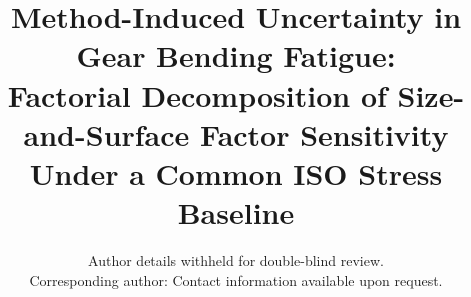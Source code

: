 \documentclass[twocolumn,12pt,a4paper]{article}
\begin{document}
\sloppy  %

\title{\textbf{Method-Induced Uncertainty in Gear Bending Fatigue:\\
Factorial Decomposition of Size-and-Surface Factor Sensitivity\\
Under a Common ISO Stress Baseline}}

\author{Author details withheld for double-blind review.\\
Corresponding author: Contact information available upon request.}

\maketitle

\end{document}
